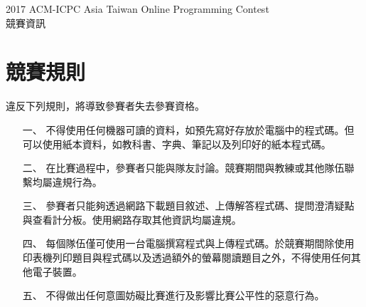 \begin{center}
{\LARGE 2017 ACM-ICPC Asia Taiwan Online Programming Contest}\\
{\LARGE 競賽資訊}
\end{center}


\section*{競賽規則}
違反下列規則，將導致參賽者失去參賽資格。
\begin{enumerate}
\item[一、]不得使用任何機器可讀的資料，如預先寫好存放於電腦中的程式碼。但可以使用紙本資料，如教科書、字典、筆記以及列印好的紙本程式碼。
\item[二、]在比賽過程中，參賽者只能與隊友討論。競賽期間與教練或其他隊伍聯繫均屬違規行為。
\item[三、]參賽者只能夠透過網路下載題目敘述、上傳解答程式碼、提問澄清疑點與查看計分板。使用網路存取其他資訊均屬違規。
\item[四、]每個隊伍僅可使用一台電腦撰寫程式與上傳程式碼。於競賽期間除使用印表機列印題目與程式碼以及透過額外的螢幕閱讀題目之外，不得使用任何其他電子裝置。
\item[五、]不得做出任何意圖妨礙比賽進行及影響比賽公平性的惡意行為。
\end{enumerate}

